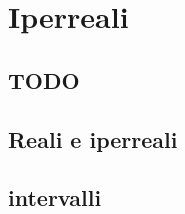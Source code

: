 
\chapter{Iperreali}

\section{TODO}

\section{Reali e iperreali}
\label{sec:01_reali_iperreali}

% 


\section{intervalli}
\label{sec:02_intervalli}

